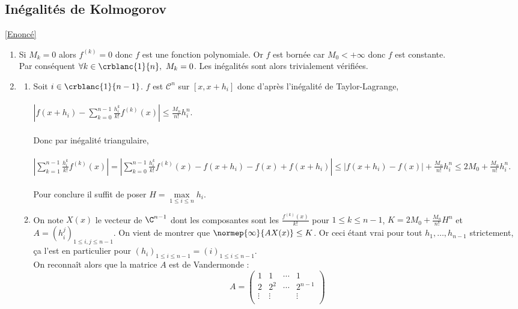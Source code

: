 \documentclass{book}
\begin{document}
	\subsection{Inégalités de Kolmogorov }
	\label{Inégalités de Kolmogorov corrigé}
	\textcolor{blue}{\hyperref[Inégalités de Kolmogorov]{[Enoncé]}}\\
	\begin{enumerate}[leftmargin=*]
		\item Si $M_k=0$ alors $f^{(k)}=0$ donc $f$ est une fonction polynomiale. Or $f$ est bornée car $M_0<+\infty$ donc $f$ est constante.\\
		Par conséquent $\forall k\in \crblanc{1}{n},\ M_k=0$. Les inégalités sont alors trivialement vérifiées.
		\item
		\begin{enumerate}[label=\alph*.]
			\item Soit $i\in \crblanc{1}{n-1}$. $f$ est $\mathcal C^n$ sur $[x,x+h_i]$ donc d'après l'inégalité de Taylor-Lagrange,\\\\
			$\displaystyle\left|f(x+h_i)-\sum_{k=0}^{n-1}\frac{h_i^k}{k!}f^{(k)}(x)\right|\leq \frac{M_n}{n!}h_i^n$.\\\\
			Donc par inégalité triangulaire,\\\\
			$\displaystyle\left|\sum_{k=1}^{n-1}\frac{h_i^k}{k!}f^{(k)}(x)\right|=\left|\sum_{k=0}^{n-1}\frac{h_i^k}{k!}f^{(k)}(x)-f(x+h_i)-f(x)+f(x+h_i)\right|\leq |f(x+h_i)-f(x)|+\frac{M_n}{n!}h_i^n\leq 2M_0+\frac{M_n}{n!}h_i^n$.\\\\
			Pour conclure il suffit de poser $H=\max\limits_{1\leq i\leq n}h_i$.
			\item On note $X(x)$ le vecteur de $\C^{n-1}$ dont les composantes sont les $\displaystyle\frac{f^{(k)}(x)}{k!}$ pour $1\leq k\leq n-1$, $K=2M_0+\displaystyle\frac{M_n}{n!}H^n$ et $A=\left(h_i^j\right)_{1\leq i,j\leq n-1}$. On vient de montrer que $\normep{\infty}{AX(x)}\leq K$. Or ceci étant vrai pour tout $h_1,\dots,h_{n-1}$ strictement, ça l'est en particulier pour $(h_i)_{1\leq i\leq n-1}=(i)_{1\leq i\leq n-1}$.\\
			On reconnaît alors que la matrice $A$ est de Vandermonde :
			$$A=\begin{pmatrix}
				1&1&\cdots&1\\
				2&2^2&\cdots&2^{n-1}\\
				\vdots&\vdots& &\vdots\\

\end{pmatrix}$$
\end{enumerate}
\end{enumerate}
\end{document}
